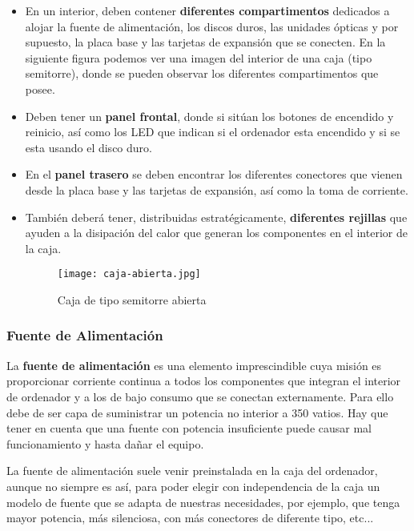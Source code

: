 \begin{itemize}
    \item En un interior, deben contener \textbf{diferentes compartimentos} dedicados a alojar la fuente de alimentación, los discos duros, las unidades ópticas y por supuesto, la placa base y las tarjetas de expansión que se conecten. En la siguiente figura podemos ver una imagen del interior de una caja (tipo semitorre), donde se pueden observar los diferentes compartimentos que posee.

    \item Deben tener un \textbf{panel frontal}, donde si sitúan los botones de encendido y reinicio, así como los LED que indican si el ordenador esta encendido y si se esta usando el disco duro.

    \item En el \textbf{panel trasero} se deben encontrar los diferentes conectores que vienen desde la placa base y las tarjetas de expansión, así como la toma de corriente.

    \item También deberá tener, distribuidas estratégicamente, \textbf{diferentes rejillas} que ayuden a la disipación del calor que generan los componentes en el interior de la caja.

   \begin{figure}[ht]
        \centering
        \texttt{[image: caja-abierta.jpg]}
        \caption{Caja de tipo semitorre abierta}
    \end{figure}
\end{itemize}

\subsubsection{Fuente de Alimentación}
La \textbf{fuente de alimentación} es una elemento imprescindible cuya misión es proporcionar corriente continua a todos los componentes que integran el interior de ordenador y a los de bajo consumo que se conectan externamente. Para ello debe de ser capa de suministrar un potencia no interior a 350 vatios. Hay que tener en cuenta que una fuente con potencia insuficiente puede causar mal funcionamiento y hasta dañar el equipo.

La fuente de alimentación suele venir preinstalada en la caja del ordenador, aunque no siempre es así, para poder elegir con independencia de la caja un modelo de fuente que se adapta de nuestras necesidades, por ejemplo, que tenga mayor potencia, más silenciosa, con más conectores de diferente tipo, etc...

